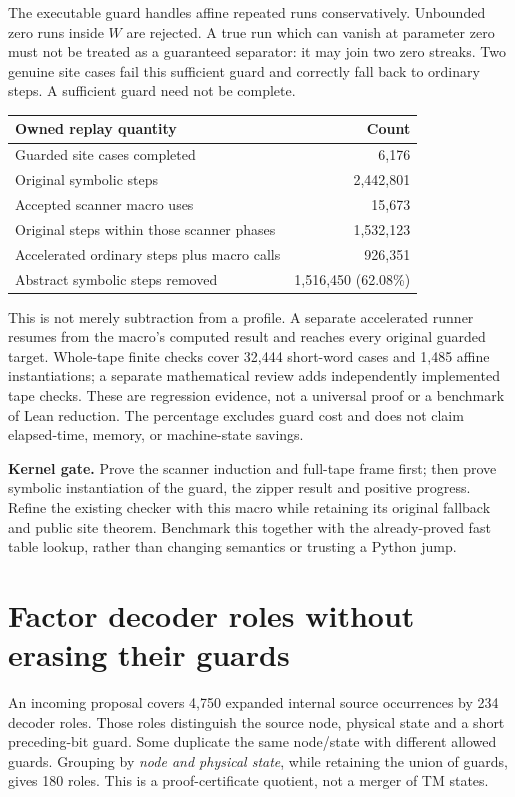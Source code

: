 \documentclass[11pt]{article}
\begin{document}
The executable guard handles affine repeated runs conservatively. Unbounded zero runs inside $W$ are rejected. A true run which can vanish at parameter zero must not be treated as a guaranteed separator: it may join two zero streaks. Two genuine site cases fail this sufficient guard and correctly fall back to ordinary steps. A sufficient guard need not be complete.

\begin{center}\small
\renewcommand{\arraystretch}{1.12}
\begin{tabular}{lr}
\toprule
Owned replay quantity & Count\\\midrule
Guarded site cases completed & 6,176\\
Original symbolic steps & 2,442,801\\
Accepted scanner macro uses & 15,673\\
Original steps within those scanner phases & 1,532,123\\
Accelerated ordinary steps plus macro calls & 926,351\\
Abstract symbolic steps removed & 1,516,450 (62.08\%)\\\bottomrule
\end{tabular}
\end{center}

This is not merely subtraction from a profile. A separate accelerated runner resumes from the macro's computed result and reaches every original guarded target. Whole-tape finite checks cover 32,444 short-word cases and 1,485 affine instantiations; a separate mathematical review adds independently implemented tape checks. These are regression evidence, not a universal proof or a benchmark of Lean reduction. The percentage excludes guard cost and does not claim elapsed-time, memory, or machine-state savings.

\textbf{Kernel gate.} Prove the scanner induction and full-tape frame first; then prove symbolic instantiation of the guard, the zipper result and positive progress. Refine the existing checker with this macro while retaining its original fallback and public site theorem. Benchmark this together with the already-proved fast table lookup, rather than changing semantics or trusting a Python jump.

\section{Factor decoder roles without erasing their guards}
An incoming proposal covers 4,750 expanded internal source occurrences by 234 decoder roles. Those roles distinguish the source node, physical state and a short preceding-bit guard. Some duplicate the same node/state with different allowed guards. Grouping by \emph{node and physical state}, while retaining the union of guards, gives 180 roles. This is a proof-certificate quotient, not a merger of TM states.
\end{document}
